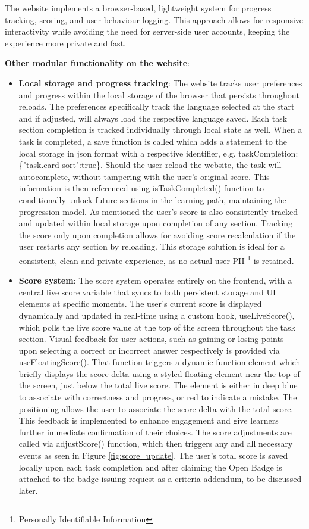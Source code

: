The website implements a browser-based, lightweight system for progress tracking, scoring, and user behaviour logging. 
This approach allows for responsive interactivity while avoiding the need for server-side user accounts, keeping the experience more private and fast.

\textbf{Other modular functionality on the website}:
\begin{itemize}
    \item \textbf{Local storage and progress tracking}: The website tracks user preferences and progress within the local storage of the browser that persists throughout reloads. 
    The preferences specifically track the language selected at the start and if adjusted, will always load the respective language saved.
    Each task section completion is tracked individually through local state as well.
    When a task is completed, a save function is called which adds a statement to the local storage in \acrshort{json} format with a respective identifier, e.g. taskCompletion: \{"task.card-sort":true\}. 
    Should the user reload the website, the task will autocomplete, without tampering with the user's original score.
    This information is then referenced using isTaskCompleted() function to conditionally unlock future sections in the learning path, maintaining the progression model. 
    As mentioned the user's score is also consistently tracked and updated within local storage upon completion of any section.
    Tracking the score only upon completion allows for avoiding score recalculation if the user restarts any section by reloading. 
    This storage solution is ideal for a consistent, clean and private experience, as no actual user PII \footnote{Personally Identifiable Information} is retained.
    \item \textbf{Score system}: The score system operates entirely on the frontend, with a central live score variable that syncs to both persistent storage and UI elements at specific moments. 
    The user’s current score is displayed dynamically and updated in real-time using a custom hook, useLiveScore(), which polls the live score value at the top of the screen throughout the task section. 
    Visual feedback for user actions, such as gaining or losing points upon selecting a correct or incorrect answer respectively is provided via useFloatingScore(). 
    That function triggers a dynamic function element which briefly displays the score delta using a styled floating element near the top of the screen, just below the total live score. 
    The element is either in deep blue to associate with correctness and progress, or red to indicate a mistake.
    The positioning allows the user to associate the score delta with the total score. 
    This feedback is implemented to enhance engagement and give learners further immediate confirmation of their choices.
    The score adjustments are called via adjustScore() function, which then triggers any and all necessary events as seen in Figure \ref{fig:score_update}.
    The user's total score is saved locally upon each task completion and after claiming the Open Badge is attached to the badge issuing request as a criteria addendum, to be discussed later.
    

\end{itemize}
